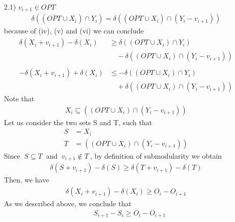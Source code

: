 \documentclass[a4paper,11pt]{article}
\begin{document}
\begin{itemize}
	\item[2.1)] $ v_{i+1} \in OPT$
	\begin{align*}
	\delta((\overline{OPT} \cup X_i) \cap Y_i) = \delta((\overline{OPT} \cup X_{i}) \cap (Y_{i} - v_{i+1}))
	\end{align*}
	because of (iv), (v) and (vi) we can conclude
	\begin{align*}
	\delta(X_{i} + v_{i+1})  - \delta(X_{i}) &\geq  \delta((OPT \cup X_i) \cap Y_i)\\ &\quad - \delta((OPT \cup X_{i}) \cap (Y_{i} - v_{i+1}))\\\\
	-\delta(X_{i} + v_{i+1})  + \delta(X_{i}) &\leq  - \delta((OPT \cup X_i) \cap Y_i)\\ &\quad + \delta((OPT \cup X_{i}) \cap (Y_{i} - v_{i+1}))
	\end{align*}
	Note that 
	\begin{align*}
	X_i \subseteq ((OPT \cup X_{i}) \cap (Y_{i} - v_{i+1}))
	\end{align*}
	Let us consider the two sets S and T, such that
	\begin{align*}
	S &= X_i \\
	T &=((OPT \cup X_{i}) \cap (Y_{i} - v_{i+1}))
	\end{align*} 
	Since $\ S \subseteq T \ $ and $\ v_{i+1} \not \in T \ $, by definition of submodularity we obtain
	\begin{align*}
	\delta(S + v_{i+1}) - \delta(S)  \geq  \delta(T + v_{i+1}) - \delta(T)
	\end{align*}
	Then, we have
	\begin{align*}
	\delta(X_{i} + v_{i+1})  - \delta(X_{i})   \geq  O_i - O_{i+1} 
	\end{align*}
	As we described above, we conclude that
	\begin{align*}
	\quad S_{i+1} - S_i  \geq O_i - O_{i+1}
	\end{align*}
	
	
	

\end{itemize}
\end{document}
